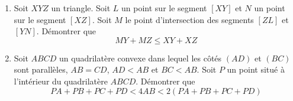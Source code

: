 \begin{enumerate}
\item Soit $XYZ$ un triangle. Soit $L$ un point sur le segment $[XY]$ et $N$ un point sur le segment $[XZ]$. Soit $M$ le point d'intersection des segments $[ZL]$ et $[YN]$. Démontrer que
$$MY + MZ \le XY + XZ$$

\item Soit $ABCD$ un quadrilatère convexe dans lequel les côtés $(AD)$ et $(BC)$ sont parallèles,
${AB = CD}$, $AD < AB$ et $BC < AB$. Soit $P$ un point situé à l'intérieur du quadrilatère $ABCD$. Démontrer que
$$PA + PB + PC + PD < 4AB < 2(PA + PB + PC + PD)$$
\end{enumerate}